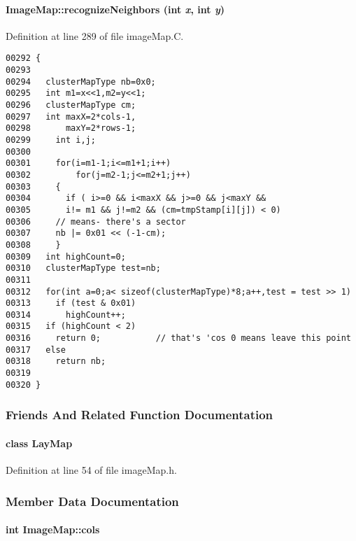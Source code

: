 \paragraph{ Image\-Map::recognize\-Neighbors (int {\em x}, int {\em y})}\hfill



Definition at line 289 of file image\-Map.C.\small\begin{verbatim}00292 {
00293 
00294   clusterMapType nb=0x0;
00295   int m1=x<<1,m2=y<<1;
00296   clusterMapType cm;
00297   int maxX=2*cols-1,
00298       maxY=2*rows-1;
00299     int i,j;
00300 
00301     for(i=m1-1;i<=m1+1;i++)
00302         for(j=m2-1;j<=m2+1;j++)
00303     {
00304       if ( i>=0 && i<maxX && j>=0 && j<maxY && 
00305       i!= m1 && j!=m2 && (cm=tmpStamp[i][j]) < 0)  
00306     // means- there's a sector
00307     nb |= 0x01 << (-1-cm);  
00308     }
00309   int highCount=0;
00310   clusterMapType test=nb;
00311 
00312   for(int a=0;a< sizeof(clusterMapType)*8;a++,test = test >> 1)
00313     if (test & 0x01)
00314       highCount++; 
00315   if (highCount < 2)
00316     return 0;           // that's 'cos 0 means leave this point
00317   else
00318     return nb;
00319 
00320 }
\end{verbatim}\normalsize 


\subsubsection{Friends And Related Function Documentation}
\label{ImageMap_l0}
\paragraph{\setlength{\rightskip}{0pt plus 5cm}class Lay\-Map\hspace{0.3cm}{\tt  [friend]}}\hfill



Definition at line 54 of file image\-Map.h.

\subsubsection{Member Data Documentation}
\label{ImageMap_o4}
\paragraph{\setlength{\rightskip}{0pt plus 5cm}int Image\-Map::cols\hspace{0.3cm}{\tt  [private]}}\hfill



